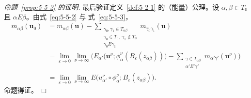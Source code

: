 \begin{proof}[命题~\ref{prop:5-5-2} 的证明]
最后验证定义~\ref{def:5-2-1} 的（能量）公理。设
$\alpha,\beta\in T_0$ 且 $\alpha E\beta$。由式~\eqref{eq:5-5-2} 与
式~\eqref{eq:5-5-3}，
\[
  \begin{aligned}
  m_{\alpha\beta}(\mathbf u_0)
  &=m_{\alpha\beta}(\mathbf u)
    -\sum_{\substack{\gamma_0,\gamma_1\in T_{\alpha\beta}\\
                      \gamma_0\in T_0,\ \gamma_1\notin T_0\\
                      \gamma_0E\gamma_1}}
      m_{\gamma_0\gamma_1}(\mathbf u)\\
  &=\lim_{\varepsilon\to0}\lim_{\nu\to\infty}
    \Biggl(
      E_{\alpha'}\bigl(\mathbf u^\nu;
        \phi_\alpha^\nu(B_\varepsilon(z_{\alpha\beta}))\bigr)
      -\sum_{\substack{\gamma\in T_{\alpha\beta}\\
                        \alpha'E'\gamma'}}
        m_{\alpha'\gamma'}(\mathbf u^\nu)
    \Biggr)\\
  &=\lim_{\varepsilon\to0}\lim_{\nu\to\infty}
    E\bigl(u_{\alpha'}^\nu\circ\phi_\alpha^\nu;
      B_\varepsilon(z_{\alpha\beta})\bigr).
  \end{aligned}
\]
命题得证。
\end{proof}

